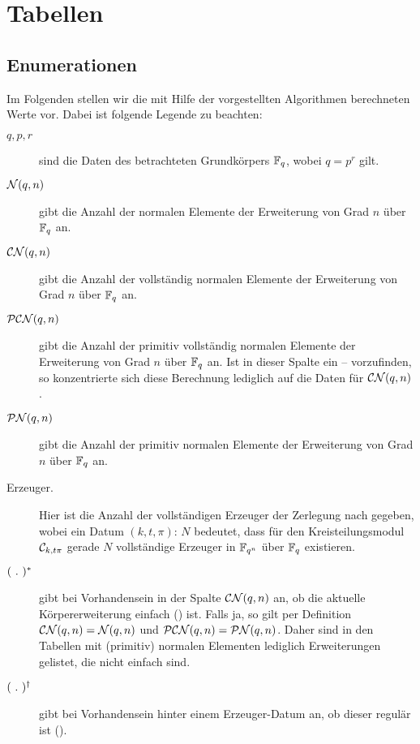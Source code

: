 \chapter{Tabellen}

\section{Enumerationen}
\label{anh:sec:enumerationen}

Im Folgenden stellen wir die mit Hilfe der vorgestellten Algorithmen
berechneten Werte vor. Dabei ist folgende Legende zu beachten:
\begin{description}
  \item[$q, p,r$] sind die Daten des betrachteten Grundkörpers $\F_q$, wobei
    $q = p^r$ gilt.
  \item[$\cal N(q,n)$] gibt die Anzahl der normalen Elemente
    der Erweiterung von Grad $n$ über $\F_q$ an.
  \item[$\CN(q,n)$] gibt die Anzahl der vollständig normalen Elemente
    der Erweiterung von Grad $n$ über $\F_q$ an.
  \item[$\PCN(q,n)$] gibt die Anzahl der primitiv vollständig normalen Elemente 
    der Erweiterung von Grad $n$ über $\F_q$ an. Ist in dieser Spalte ein
    -- vorzufinden, so konzentrierte sich diese Berechnung lediglich auf 
    die Daten für $\CN(q,n)$.
  \item[$\PN(q,n)$] gibt die Anzahl der primitiv normalen Elemente 
    der Erweiterung von Grad $n$ über $\F_q$ an.
  \item[\normalfont Erzeuger.] Hier ist die Anzahl der vollständigen Erzeuger
    der Zerlegung nach  gegeben, wobei ein Datum
    $(k,t,\pi):\, N$ bedeutet, dass für den Kreisteilungsmodul 
    $\C_{k,t\pi}$ gerade $N$ vollständige Erzeuger in $\F_{q^n}$ über $\F_q$
    existieren.
  \item[$(\speq.)^\ast$] gibt bei Vorhandensein in der Spalte $\CN(q,n)$ an, 
    ob die aktuelle Körpererweiterung einfach () ist.
    Falls ja, so gilt per Definition
    $\CN(q,n) = \cal N(q,n)$ und $\PCN(q,n) = \PN(q,n)$.
    Daher sind in den Tabellen mit (primitiv) normalen Elementen lediglich
    Erweiterungen gelistet, die nicht einfach sind.
  \item[$(\speq.)^\dagger$] gibt bei Vorhandensein hinter einem Erzeuger-Datum
    an, ob dieser regulär ist ().
\end{description}

